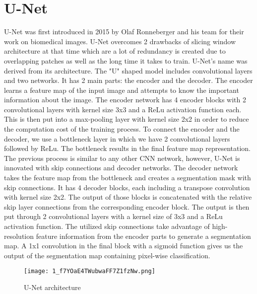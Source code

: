 \documentclass[hidelinks]{report}
\begin{document}
\section{U-Net}
U-Net was first introduced in 2015 by Olaf Ronneberger and his team for their work on biomedical images. U-Net overcomes 2 drawbacks of slicing window architecture at that time which are a lot of redundancy is created due to overlapping patches as well as the long time it takes to train. 
U-Net's name was derived from its architecture. The "U" shaped model includes convolutional layers and two networks. It has 2 main parts: the encoder and the decoder. The encoder learns a feature map of the input image and attempts to know the important information about the image. The encoder network has 4 encoder blocks with 2 convolutional layers with kernel size 3x3 and a ReLu activation function each. This is then put into a max-pooling layer with kernel size 2x2 in order to reduce the computation cost of the training process. To connect the encoder and the decoder, we use a bottleneck layer in which we have 2 convolutional layers followed by ReLu. The bottleneck results in the final feature map representation. The previous process is similar to any other CNN network, however, U-Net is innovated with skip connections and decoder networks. The decoder network takes the feature map from the bottleneck and creates a segmentation mask with skip connections. It has 4 decoder blocks, each including a transpose convolution with kernel size 2x2. The output of those blocks is concatenated with the relative skip layer connections from the corresponding encoder block. The output is then put through 2 convolutional layers with a kernel size of 3x3 and a ReLu activation function. The utilized skip connections take advantage of high-resolution feature information from the encoder parts to generate a segmentation map. A 1x1 convolution in the final block with a sigmoid function gives us the output of the segmentation map containing pixel-wise classification. 
\begin{figure}[H]
    \centering
    \texttt{[image: 1\_f7YOaE4TWubwaFF7Z1fzNw.png]}
    \caption{U-Net architecture}
    \label{fig:enter-label}
\end{figure}
\end{document}

